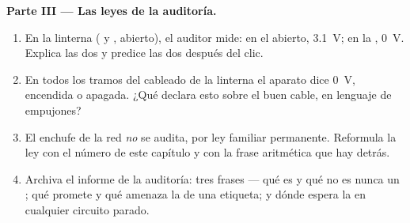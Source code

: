 \begin{problem}
\medskip\noindent\textbf{Parte III --- Las leyes de la auditoría.}
\begin{enumerate}[resume]
  \item En la linterna ( y  ,
         abierto), el auditor mide: en el
         abierto, \qty{3.1}{V}; en la
        , \qty{0}{V}. Explica las dos y predice las dos
        después del clic.
  \item En todos los tramos del cableado de la linterna el aparato
        dice \qty{0}{V}, encendida o apagada. ¿Qué declara esto sobre
        el buen cable, en lenguaje de empujones?
  \item El enchufe de la red \emph{no} se audita, por ley familiar
        permanente. Reformula la ley con el número de este capítulo y
        con la frase aritmética que hay detrás.
  \item Archiva el informe de la auditoría: tres frases --- qué es y
        qué no es nunca un ; qué promete y qué amenaza
        la  de una etiqueta; y dónde espera la
         en cualquier circuito parado.
\end{enumerate}
\end{problem}

